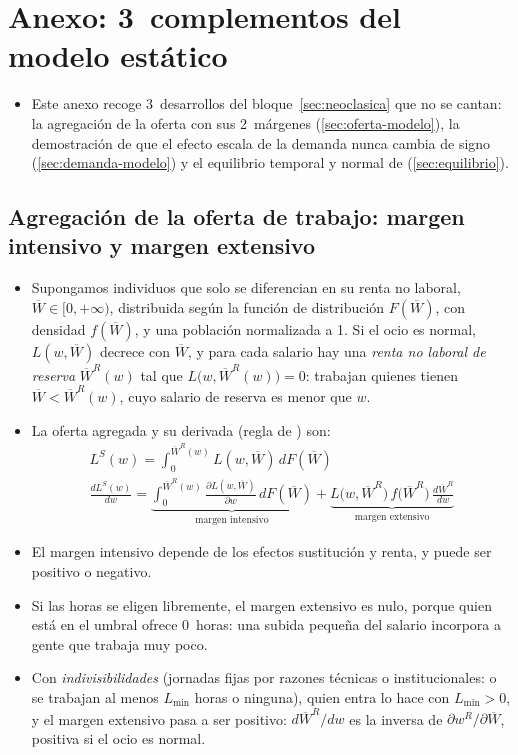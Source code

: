 \documentclass[11pt]{article}
\begin{document}
\section{Anexo: 3~complementos del modelo estático}\label{anexo:complementos-neoclasico}

\begin{itemize}
\item Este anexo recoge 3~desarrollos del bloque~\ref{sec:neoclasica} que no se cantan: la agregación de la oferta con sus 2~márgenes (\ref{sec:oferta-modelo}), la demostración de que el efecto escala de la demanda nunca cambia de signo (\ref{sec:demanda-modelo}) y el equilibrio temporal y normal de  (\ref{sec:equilibrio}).
\end{itemize}

\subsection{Agregación de la oferta de trabajo:\cortetitulo{} margen intensivo y margen extensivo}\label{anexo:agregacion-oferta}

\begin{itemize}
\item Supongamos individuos que solo se diferencian en su renta no laboral, $\overline{W}\in[0,+\infty)$, distribuida según la función de distribución $F(\overline{W})$, con densidad $f(\overline{W})$, y una población normalizada a 1. Si el ocio es normal, $L(w,\overline{W})$ decrece con $\overline{W}$, y para cada salario hay una \emph{renta no laboral de reserva} $\overline{W}^R(w)$ tal que $L\big(w,\overline{W}^R(w)\big)=0$: trabajan quienes tienen $\overline{W}<\overline{W}^R(w)$, cuyo salario de reserva es menor que $w$.
\item La oferta agregada y su derivada (regla de ) son:
  \begin{gather*}
  L^S(w)=\int_{0}^{\overline{W}^R(w)}L(w,\overline{W})\,dF(\overline{W})\\
  \frac{dL^S(w)}{dw}=\underbrace{\int_{0}^{\overline{W}^R(w)}\frac{\partial L(w,\overline{W})}{\partial w}\,dF(\overline{W})}_{\text{margen intensivo}}+\underbrace{L\big(w,\overline{W}^R\big)\,f\big(\overline{W}^R\big)\,\frac{d\overline{W}^R}{dw}}_{\text{margen extensivo}}
  \end{gather*}
\item El margen intensivo depende de los efectos sustitución y renta, y puede ser positivo o negativo.
\item Si las horas se eligen libremente, el margen extensivo es nulo, porque quien está en el umbral ofrece 0~horas: una subida pequeña del salario incorpora a gente que trabaja muy poco.
\item Con \emph{indivisibilidades} (jornadas fijas por razones técnicas o institucionales: o se trabajan al menos $L_{\min}$ horas o ninguna), quien entra lo hace con $L_{\min}>0$, y el margen extensivo pasa a ser positivo: $d\overline{W}^R/dw$ es la inversa de $\partial w^R/\partial\overline{W}$, positiva si el ocio es normal\nocite{Cahuc2014Labor}.
\end{itemize}
\end{document}
